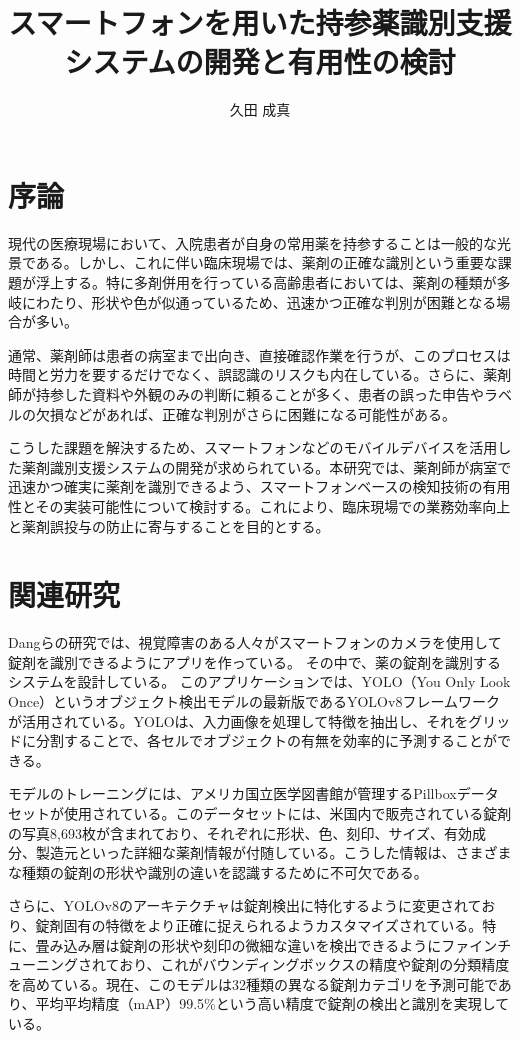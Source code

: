 \documentclass[twocolumn,12pt]{article}
\title{スマートフォンを用いた持参薬識別支援システムの開発と有用性の検討}
\author{久田 成真}
\date{}
\begin{document}
\maketitle
\section{序論}

現代の医療現場において、入院患者が自身の常用薬を持参することは一般的な光景である。しかし、これに伴い臨床現場では、薬剤の正確な識別という重要な課題が浮上する。特に多剤併用を行っている高齢患者においては、薬剤の種類が多岐にわたり、形状や色が似通っているため、迅速かつ正確な判別が困難となる場合が多い。

通常、薬剤師は患者の病室まで出向き、直接確認作業を行うが、このプロセスは時間と労力を要するだけでなく、誤認識のリスクも内在している。さらに、薬剤師が持参した資料や外観のみの判断に頼ることが多く、患者の誤った申告やラベルの欠損などがあれば、正確な判別がさらに困難になる可能性がある。

こうした課題を解決するため、スマートフォンなどのモバイルデバイスを活用した薬剤識別支援システムの開発が求められている。本研究では、薬剤師が病室で迅速かつ確実に薬剤を識別できるよう、スマートフォンベースの検知技術の有用性とその実装可能性について検討する。これにより、臨床現場での業務効率向上と薬剤誤投与の防止に寄与することを目的とする。

\section{関連研究}


Dangらの研究\cite{Dang_2024}では、視覚障害のある人々がスマートフォンのカメラを使用して錠剤を識別できるようにアプリを作っている。
その中で、薬の錠剤を識別するシステムを設計している。
このアプリケーションでは、YOLO（You Only Look Once）というオブジェクト検出モデルの最新版であるYOLOv8フレームワークが活用されている。YOLOは、入力画像を処理して特徴を抽出し、それをグリッドに分割することで、各セルでオブジェクトの有無を効率的に予測することができる。

モデルのトレーニングには、アメリカ国立医学図書館が管理するPillboxデータセットが使用されている。このデータセットには、米国内で販売されている錠剤の写真8,693枚が含まれており、それぞれに形状、色、刻印、サイズ、有効成分、製造元といった詳細な薬剤情報が付随している。こうした情報は、さまざまな種類の錠剤の形状や識別の違いを認識するために不可欠である。

さらに、YOLOv8のアーキテクチャは錠剤検出に特化するように変更されており、錠剤固有の特徴をより正確に捉えられるようカスタマイズされている。特に、畳み込み層は錠剤の形状や刻印の微細な違いを検出できるようにファインチューニングされており、これがバウンディングボックスの精度や錠剤の分類精度を高めている。現在、このモデルは32種類の異なる錠剤カテゴリを予測可能であり、平均平均精度（mAP）99.5\%という高い精度で錠剤の検出と識別を実現している。
\end{document}
